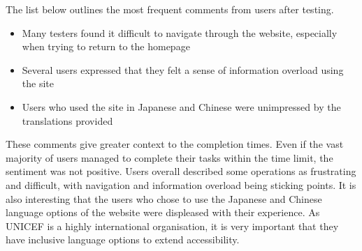 The list below outlines the most frequent comments from users after testing. 
\begin{itemize}
    \item Many testers found it difficult to navigate through the website, especially when trying to return to the homepage
    \item Several users expressed that they felt a sense of information overload using the site
    \item Users who used the site in Japanese and Chinese were unimpressed by the translations provided
\end{itemize}

These comments give greater context to the completion times. Even if the vast majority of users managed to complete their tasks within the time limit, the sentiment was not positive. 
Users overall described some operations as frustrating and difficult, with navigation and information overload being sticking points. 
It is also interesting that the users who chose to use the Japanese and Chinese language options of the website were displeased with their experience. As UNICEF is a highly international organisation, it is very important that they have inclusive language options to extend accessibility. 
